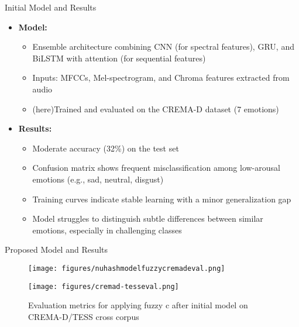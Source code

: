 \documentclass[final]{beamer}
\begin{document}
\begin{frame}[t]
\begin{minipage}[t]{0.42\textwidth}
\begin{block}{Initial Model and Results}
\begin{itemize}
    \item \textbf{Model:}
    \begin{itemize}
        \item Ensemble architecture combining CNN (for spectral features), GRU, and BiLSTM with attention (for sequential features)\cite{electronics10101163}
        \item Inputs: MFCCs, Mel-spectrogram, and Chroma features extracted from audio
        \item (here)Trained and evaluated on the CREMA-D dataset (7 emotions)
    \end{itemize}
    \item \textbf{Results:}
    \begin{itemize}
        \item Moderate accuracy (32\%) on the test set
        \item Confusion matrix shows frequent misclassification among low-arousal emotions (e.g., sad, neutral, disgust)
        \item Training curves indicate stable learning with a minor generalization gap
        \item Model struggles to distinguish subtle differences between similar emotions, especially in challenging classes
    \end{itemize}
\end{itemize}
\end{block}


\begin{block}{Proposed Model and Results}

   \begin{figure}[h!]
        \centering
        \begin{minipage}[b]{0.49\textwidth}
            \centering
            \texttt{[image: figures/nuhashmodelfuzzycremadeval.png]} %
            \caption{Evaluation metrics for applying fuzzy c after initial model on CREMA-D}
            \label{fig:fuzzycremaeval}
        \end{minipage}
        \hfill
        \begin{minipage}[b]{0.49\textwidth}
            \centering
            \texttt{[image: figures/cremad-tesseval.png]} %
            \caption{Evaluation metrics for applying fuzzy c after initial model on CREMA-D/TESS cross corpus}
            \label{fig:fuzzycrematess}
        \end{minipage}
    \end{figure}


\end{block}
\end{minipage}
\end{frame}
\end{document}

